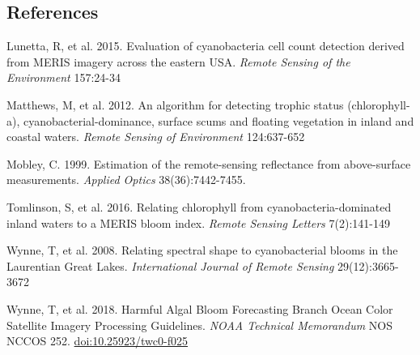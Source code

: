\documentclass[]{article}
\begin{document}
\subsection{References}\label{references}

Lunetta, R, et al. 2015. Evaluation of cyanobacteria cell count
detection derived from MERIS imagery across the eastern USA.
\emph{Remote Sensing of the Environment} 157:24-34

Matthews, M, et al. 2012. An algorithm for detecting trophic status
(chlorophyll-a), cyanobacterial-dominance, surface scums and floating
vegetation in inland and coastal waters. \emph{Remote Sensing of
Environment} 124:637-652

Mobley, C. 1999. Estimation of the remote-sensing reflectance from
above-surface measurements. \emph{Applied Optics} 38(36):7442-7455.

Tomlinson, S, et al. 2016. Relating chlorophyll from
cyanobacteria-dominated inland waters to a MERIS bloom index.
\emph{Remote Sensing Letters} 7(2):141-149

Wynne, T, et al. 2008. Relating spectral shape to cyanobacterial blooms
in the Laurentian Great Lakes. \emph{International Journal of Remote
Sensing} 29(12):3665-3672

Wynne, T, et al. 2018. Harmful Algal Bloom Forecasting Branch Ocean
Color Satellite Imagery Processing Guidelines. \emph{NOAA Technical
Memorandum} NOS NCCOS 252. \url{doi:10.25923/twc0-f025}
\end{document}
